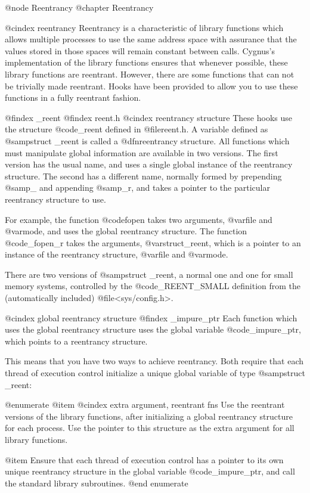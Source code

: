 @node Reentrancy
@chapter Reentrancy

@cindex reentrancy
Reentrancy is a characteristic of library functions which allows multiple
processes to use the same address space with assurance that the values stored
in those spaces will remain constant between calls. Cygnus's implementation
of the library functions ensures that 
whenever possible, these library functions are reentrant.  However,
there are some functions that can not be trivially made reentrant.
Hooks have been provided to allow you to use these functions in a fully
reentrant fashion.

@findex _reent
@findex reent.h
@cindex reentrancy structure
These hooks use the structure @code{_reent} defined in @file{reent.h}.
A variable defined as @samp{struct _reent} is called a @dfn{reentrancy
structure}.  All functions which must manipulate global information are
available in two versions.  The first version has the usual name, and
uses a single global instance of the reentrancy structure.  The second
has a different name, normally formed by prepending @samp{_} and
appending @samp{_r}, and takes a pointer to the particular reentrancy
structure to use.

For example, the function @code{fopen} takes two arguments, @var{file}
and @var{mode}, and uses the global reentrancy structure.  The function
@code{_fopen_r} takes the arguments, @var{struct_reent}, which is a
pointer to an instance of the reentrancy structure, @var{file}
and @var{mode}.	

There are two versions of @samp{struct _reent}, a normal one and one
for small memory systems, controlled by the @code{_REENT_SMALL}
definition from the (automatically included) @file{<sys/config.h>}.

@cindex global reentrancy structure
@findex _impure_ptr
Each function which uses the global reentrancy structure uses the global
variable @code{_impure_ptr}, which points to a reentrancy structure.

This means that you have two ways to achieve reentrancy.  Both require
that each thread of execution control initialize a unique global
variable of type @samp{struct _reent}:

@enumerate
@item
@cindex extra argument, reentrant fns
Use the reentrant versions of the library functions, after initializing
a global reentrancy structure for each process.  Use the pointer to this
structure as the extra argument for all library functions.

@item
Ensure that each thread of execution control has a pointer to its own
unique reentrancy structure in the global variable @code{_impure_ptr},
and call the standard library subroutines.
@end enumerate

